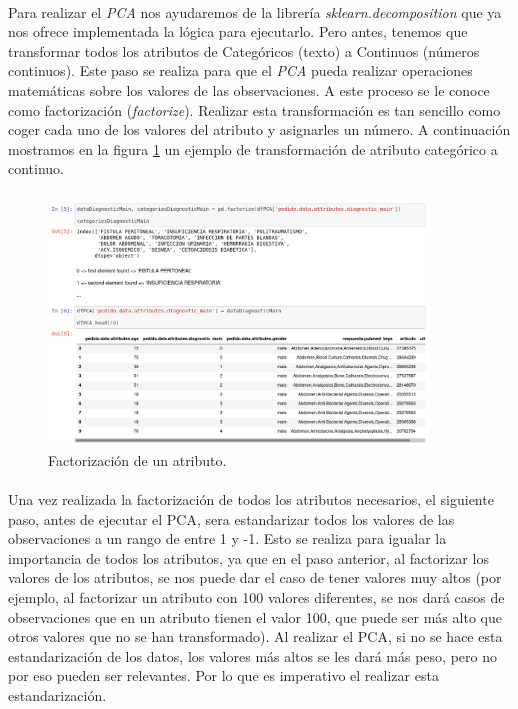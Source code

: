 \documentclass[10pt,a4paper,oneside]{book}
\begin{document}
\paragraph{}
Para realizar el \textit{PCA} nos ayudaremos de la librería \textit{sklearn.decomposition} que ya nos ofrece implementada la lógica para ejecutarlo. Pero antes, tenemos que transformar todos los atributos de Categóricos (texto) a Continuos (números continuos). Este paso se realiza para que el \textit{PCA} pueda realizar operaciones matemáticas sobre los valores de las observaciones. A este proceso se le conoce como factorización (\textit{factorize}). Realizar esta transformación es tan sencillo como coger cada uno de los valores del atributo y asignarles un número. A continuación mostramos en la figura \ref{factorize1} un ejemplo de transformación de atributo categórico a continuo.

\paragraph{}
\begin{figure}[!htb]
  \centering
    \includegraphics[width=0.9\textwidth]{images/metodologia_procesado_de_datos_factorize.png}
    \caption{Factorización de un atributo.}
  \label{factorize1}
\end{figure}

\paragraph{}
Una vez realizada la factorización de todos los atributos necesarios, el siguiente paso, antes de ejecutar el PCA, sera estandarizar todos los valores de las observaciones a un rango de entre 1 y -1. Esto se realiza para igualar la importancia de todos los atributos, ya que en el paso anterior, al factorizar los valores de los atributos, se nos puede dar el caso de tener valores muy altos (por ejemplo, al factorizar un atributo con 100 valores diferentes, se nos dará casos de observaciones que en un atributo tienen el valor 100, que puede ser más alto que otros valores que no se han transformado). Al realizar el PCA, si no se hace esta estandarización de los datos, los valores más altos se les dará más peso, pero no por eso pueden ser relevantes. Por lo que es imperativo el realizar esta estandarización.
\end{document}
